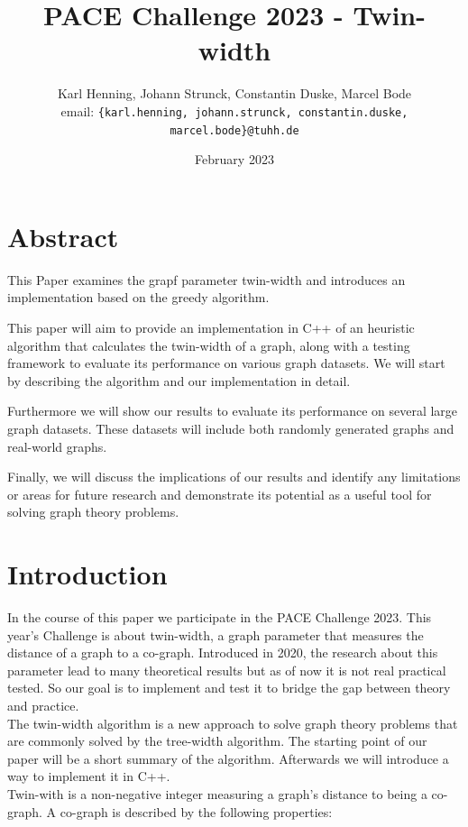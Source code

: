 \documentclass[10pt]{article}
\date{February 2023}
\title{PACE Challenge 2023 - Twin-width}
\author{
    Karl Henning, Johann Strunck, Constantin Duske, Marcel Bode\\
    email: \texttt{\{karl.henning, johann.strunck, constantin.duske, marcel.bode\}@tuhh.de}
}
\begin{document}
\maketitle{}
\section{Abstract}

This Paper examines the grapf parameter twin-width and introduces an implementation based on the greedy algorithm.

This paper will aim to provide an implementation in C++ of an heuristic algorithm that calculates the twin-width of a graph, along with a testing framework to evaluate its performance on various graph datasets. We will start by describing the algorithm and our implementation in detail.

Furthermore we will show our results to evaluate its performance on several large graph datasets. These datasets will include both randomly generated graphs and real-world graphs.

Finally, we will discuss the implications of our results and identify any limitations or areas for future research and demonstrate its potential as a useful tool for solving graph theory problems.

\section{Introduction}

In the course of this paper we participate in the PACE Challenge 2023. This year's
Challenge is about twin-width, a graph parameter that measures the distance of a graph to
a co-graph. Introduced in 2020, the research about this parameter lead to many theoretical results but as of now it is not real practical tested.  So our goal is to implement and test it to bridge the gap between theory and practice. \\ 
The twin-width algorithm is a new approach to solve graph theory problems that are commonly solved by the tree-width algorithm. The starting point of our paper will be a short summary of the algorithm. Afterwards we will introduce a way to implement it in C++. \\%

Twin-with is a non-negative integer measuring a graph's distance to being a co-graph. A
co-graph is described by the following properties: 
\end{document}
